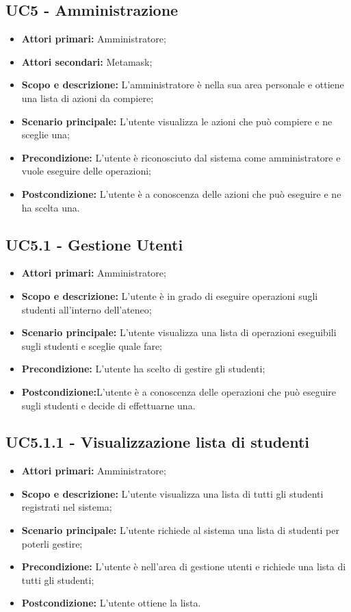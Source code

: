 \documentclass[AnalisiDeiRequisiti.tex]{subfiles}
\begin{document}
\subsection{UC5 - Amministrazione}
\begin{itemize}
	\item \textbf{Attori primari:} Amministratore;
	\item \textbf{Attori secondari:} Metamask;
	\item \textbf{Scopo e descrizione:} L'amministratore è nella sua area personale e ottiene una lista di azioni da compiere;
	\item \textbf{Scenario principale:} L'utente visualizza le azioni che può compiere e ne sceglie una; 
	\item \textbf{Precondizione:} L'utente è riconosciuto dal sistema come amministratore e vuole eseguire delle operazioni; 
	\item \textbf{Postcondizione:} L'utente è a conoscenza delle azioni che può eseguire e ne ha scelta una.
\end{itemize}
\subsection{UC5.1 - Gestione Utenti}
\begin{itemize}
	\item \textbf{Attori primari:} Amministratore;
	\item \textbf{Scopo e descrizione:} L'utente è in grado di eseguire operazioni sugli studenti all'interno dell'ateneo;
	\item \textbf{Scenario principale:} L'utente visualizza una lista di operazioni eseguibili sugli studenti e sceglie quale fare;
	\item \textbf{Precondizione:} L'utente ha scelto di gestire gli studenti; 
	\item \textbf{Postcondizione:}L'utente è a conoscenza delle operazioni che può eseguire sugli studenti e decide di effettuarne una.
\end{itemize}
\subsection{UC5.1.1 - Visualizzazione lista di studenti}
\begin{itemize}
	\item \textbf{Attori primari:} Amministratore;
	\item \textbf{Scopo e descrizione:} L'utente visualizza una lista di tutti gli studenti registrati nel sistema;
	\item \textbf{Scenario principale:} L'utente richiede al sistema una lista di studenti per poterli gestire;
	\item \textbf{Precondizione:} L'utente è nell'area di gestione utenti e richiede una lista di tutti gli studenti; 
	\item \textbf{Postcondizione:} L'utente ottiene la lista.
\end{itemize}
\end{document}
